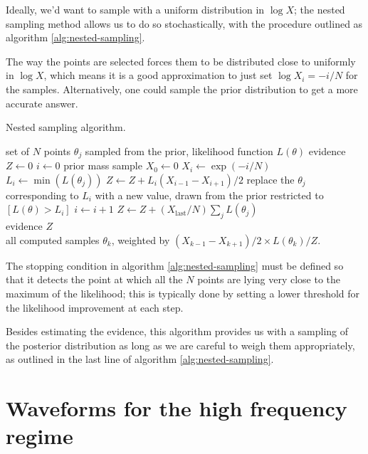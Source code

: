 \documentclass[main.tex]{subfiles}
\begin{document}
Ideally, we'd want to sample with a uniform distribution in \(\log X\); 
the nested sampling method allows us to do so stochastically, with the procedure outlined as algorithm \ref{alg:nested-sampling}. 

The way the points are selected forces them to be distributed close to uniformly in \(\log X\), which means it is a good approximation to just set \(\log X_i = - i / N\) for the samples. 
Alternatively, one could sample the prior distribution to get a more accurate answer. 

\begin{algorithm}
\caption{Nested sampling algorithm. }\label{alg:nested-sampling}
\begin{algorithmic}
\Require set of \(N\) points \(\theta _j\) sampled from the prior, likelihood function \(L(\theta )\)
\State evidence $Z \gets 0$
\State \(i \gets 0\)
\State prior mass sample $X_0  \gets 0$
\State \(X_i \gets \exp(- i / N)\) 
\State \(L_i \gets \min(L(\theta _j))\)
\State \(Z \gets Z + L_i (X_{i-1} - X_{i+1}) / 2\)
\State replace the \(\theta _j\) corresponding to \(L_i\) with a new value, 
\State drawn from the prior restricted to \([L(\theta ) > L_i]\)
\State \(i \gets i+1\)
\EndWhile 
\State \(Z \gets Z + (X _{\text{last}} / N) \sum _{j} L(\theta _j)\) \\
\Return evidence \(Z\) \\
\Return all computed samples \(\theta _k\), weighted by \((X_{k-1} - X_{k+1}) / 2 \times L(\theta_k) / Z \).
\end{algorithmic}
\end{algorithm}

The stopping condition in algorithm \ref{alg:nested-sampling} must be defined so that it detects the point at which all the \(N\) points are lying very close to the maximum of the likelihood; this is typically done by setting a lower threshold for the likelihood improvement at each step. 

Besides estimating the evidence, this algorithm provides us with a sampling of the posterior distribution as long as we are careful to weigh them appropriately, as outlined in the last line of algorithm \ref{alg:nested-sampling}.

\section{Waveforms for the high frequency regime} \label{sec:higher-order-waveforms}
\end{document}
